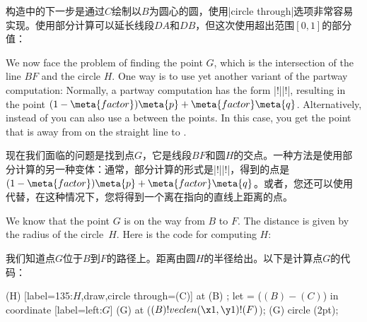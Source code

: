 \begin{paracol}{2}
构造中的下一步是通过$C$绘制以$B$为圆心的圆，使用|circle through|选项非常容易实现。使用部分计算可以延长线段$DA$和$DB$，但这次使用超出范围$[0,1]$的部分值：
%
\begin{codeexample}[preamble={\usetikzlibrary{calc,through}}]
\end{codeexample}

We now face the problem of finding the point $G$, which is the intersection of
the line $BF$ and the circle $H$. One way is to use yet another variant of the
partway computation: Normally, a partway computation has the form
|!||!|, resulting in the point
$(1-\meta{factor})\meta{p} + \meta{factor}\meta{q}$. Alternatively, instead of
 you can also use a  between the points. In this
case, you get the point that is  away from  on the
straight line to .

现在我们面临的问题是找到点$G$，它是线段$BF$和圆$H$的交点。一种方法是使用部分计算的另一种变体：通常，部分计算的形式是|!||!|，得到的点是$(1-\meta{factor})\meta{p} + \meta{factor}\meta{q}$。或者，您还可以使用代替，在这种情况下，您将得到一个离在指向的直线上距离的点。

We know that the point $G$ is on the way from $B$ to $F$. The distance is given
by the radius of the circle~$H$. Here is the code for computing $H$:

我们知道点$G$位于$B$到$F$的路径上。距离由圆$H$的半径给出。以下是计算点$G$的代码：
%
{\ifpgfmanualexternalize\tikzexternaldisable\fi
\begin{codeexample}[
    preamble={\usetikzlibrary{calc,through}},
    pre={\begin{tikzpicture}
  \coordinate [label=left:$A$]  (A) at (0,0);
  \coordinate [label=right:$B$] (B) at (0.75,0.25);
  \coordinate [label=above:$C$] (C) at (1,1.5);
  \draw (A) -- (B) -- (C);
  \coordinate [label=above:$D$] (D) at
    ($ (A) ! .5 ! (B) ! {sin(60)*2} ! 90:(B) $) {};
  \draw (D) -- ($ (D) ! 3.5 ! (B) $) coordinate [label=below:$F$] (F);
  \draw (D) -- ($ (D) ! 2.5 ! (A) $) coordinate [label=below:$E$] (E);},
    post={\end{tikzpicture}},
]
  \node (H) [label=135:$H$,draw,circle through=(C)] at (B) {};
  \path let  = ($ (B) - (C) $) in
    coordinate [label=left:$G$] (G) at ($ (B) ! veclen(\x1,\y1) ! (F) $);
  \fill[red,opacity=.5] (G) circle (2pt);
\end{codeexample}

}
\end{paracol}
